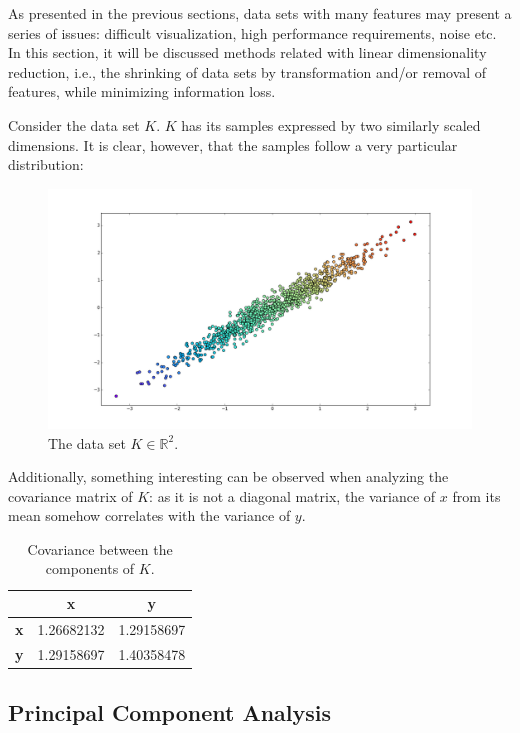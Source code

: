 \documentclass[12pt]{article}
\begin{document}
As presented in the previous sections, data sets with many features may present a series of issues: difficult visualization, high performance requirements, noise etc. In this section, it will be discussed methods related with linear dimensionality reduction, i.e., the shrinking of data sets by transformation and/or removal of features, while minimizing information loss.

Consider the data set $K$. $K$ has its samples expressed by two similarly scaled dimensions. It is clear, however, that the samples follow a very particular distribution:

\begin{figure}[H]
    \centering
	\captionsetup{justification=centering}

	\includegraphics[width=.8\linewidth]{datasets/r}
	\caption{The data set $K \in \mathbb{R}^2$.}
	\label{fig:datasetr}
\end{figure}

Additionally, something interesting can be observed when analyzing the covariance matrix of $K$: as it is not a diagonal matrix, the variance of $x$ from its mean somehow correlates with the variance of $y$. \cite{pcajon2003}

\begin{table}[H]
	\centering
	\begin{tabular}{|c|c|c|}
		\hline
			& \textbf{x} & \textbf{y} \\\hline
		\textbf{x} & 1.26682132  & 1.29158697 \\\hline
		\textbf{y} & 1.29158697  & 1.40358478 \\\hline
	\end{tabular}
	\caption{Covariance between the components of $K$.}
\end{table}

\subsection{Principal Component Analysis}
\end{document}
